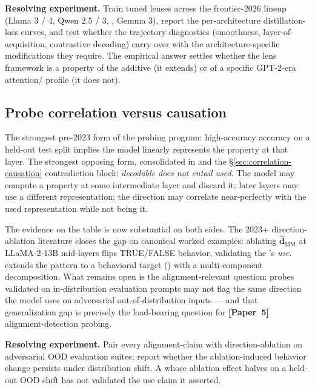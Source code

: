 \textbf{Resolving experiment.} Train tuned lenses across the
frontier-2026 lineup (Llama 3 / 4, Qwen 2.5 / 3, , Gemma 3),
report the per-architecture distillation-loss curves, and test whether
the trajectory diagnostics (smoothness, layer-of-acquisition,
contrastive  decoding) carry over with the architecture-specific
modifications they require. The empirical answer settles whether the
lens framework is a property of the additive  (it
extends) or of a specific GPT-2-era attention/ profile (it does
not).

\subsection{Probe correlation versus causation}
\label{sec:contradictions-probe}

The strongest pre-2023 form of the probing program: high-accuracy
 accuracy on a held-out test split implies the model
linearly represents the property at that layer. The strongest opposing
form, consolidated in
\citet[\S abstract]{belinkov2022-probing-survey} and the
\S\ref{sec:correlation-causation} contradiction block: \emph{decodable
does not entail used}. The model may compute a property at some
intermediate layer and discard it; later layers may use a different
representation; the  direction may correlate near-perfectly with
the used representation while not being it.

The evidence on the table is now substantial on both sides. The 2023+
direction-ablation literature
\citep[\S 3]{marks-tegmark-2023-truth} closes the gap on canonical
worked examples: ablating $\hat{\mathbf{d}}_{\text{MM}}$ at LLaMA-2-13B
mid-layers flips TRUE/FALSE behavior, validating the 's
\emph{use}.  extends the pattern to a behavioral target
() with a multi-component decomposition. What remains open
is the alignment-relevant question: probes validated on
in-distribution evaluation prompts may not flag the same direction the
model uses on adversarial out-of-distribution inputs --- and that
generalization gap is precisely the load-bearing question for
\textbf{[Paper~5]} alignment-detection probing.

\textbf{Resolving experiment.} Pair every alignment-claim  with
direction-ablation on adversarial OOD evaluation suites; report
whether the ablation-induced behavior change persists under
distribution shift. A  whose ablation effect halves on a
held-out OOD shift has not validated the use claim it asserted.

